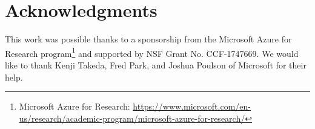 \documentclass[10pt,journal,compsoc]{IEEEtran}
\begin{document}
\section*{Acknowledgments}

This work was possible thanks to a sponsorship from the Microsoft Azure for Research program\footnote{Microsoft Azure for Research: \url{https://www.microsoft.com/en-us/research/academic-program/microsoft-azure-for-research/}} and supported by NSF Grant No. CCF-1747669.
We would like to thank Kenji Takeda, Fred Park, and Joshua Poulson of Microsoft for their help.



%
\end{document}
